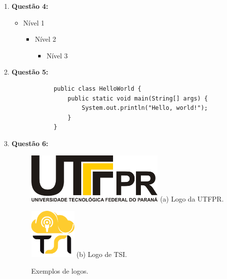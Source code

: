 \documentclass{article}
\begin{document}
\begin{enumerate}
\begin{itemize}
			\item No artigo \cite{misoczki2008criptografia}, analisa e implementa o sistema criptográfico McEliece, o qual é classificado como pós-quântico por se tratar de um sistema seguro perante as abordagens atuais de ataques utilizadno computação quântica.
			
			\item No site \cite{prodesp}, a criptografia pós-quântica envolve algoritmos e fundamentos matemáticos distintos.
			
		\end{itemize}
		

			
			 


		
		
		\item \textbf{Questão 4:}
		\begin{itemize}
			\item Nível 1
			\begin{itemize}
				\item Nível 2
				\begin{itemize}
					\item Nível 3
				\end{itemize}
			\end{itemize}
		\end{itemize}
		
		\item \textbf{Questão 5:}
		\lstset{language=Java}
		\begin{lstlisting}
			public class HelloWorld {
				public static void main(String[] args) {
					System.out.println("Hello, world!");
				}
			}
		\end{lstlisting}
		
		\item \textbf{Questão 6:}
		\begin{figure}[htbp]
			\centering
			\begin{minipage}[b]{0.40\textwidth}
				\centering
				\includegraphics[width=\textwidth,height=2.5cm]{./utfpr_logo.png}
				{(a) Logo da UTFPR.}
			\end{minipage}\hfill
			\begin{minipage}[b]{0.40\textwidth}
				\centering
				\includegraphics[width=\textwidth,height=2.5cm]{./tsi_logo.png}
				{(b) Logo de TSI.}
			\end{minipage}
			\caption{Exemplos de logos.}
		\end{figure}
		
	\end{enumerate}
	
	
\end{document}
